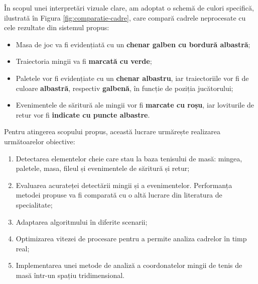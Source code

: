 În scopul unei interpretări vizuale clare, am adoptat o schemă de culori specifică, ilustrată în Figura \ref{fig:comparatie-cadre}, care compară cadrele neprocesate cu cele rezultate din sistemul propus:
\begin{itemize}
    \item Masa de joc va fi evidențiată cu un \textbf{chenar galben cu bordură albastră};
    \item Traiectoria mingii va fi \textbf{marcată cu verde};
    \item Paletele vor fi evidențiate cu un \textbf{chenar albastru}, iar traiectoriile vor fi de culoare \textbf{albastră}, respectiv \textbf{galbenă}, în funcție de poziția jucătorului;
    \item Evenimentele de săritură ale mingii vor fi \textbf{marcate cu roșu}, iar loviturile de retur vor fi \textbf{indicate cu puncte albastre}.
\end{itemize}


Pentru atingerea scopului propus, această lucrare urmărește realizarea următoarelor obiective:
\begin{enumerate}
    \item Detectarea elementelor cheie care stau la baza tenisului de masă: mingea, paletele, masa, fileul și evenimentele de săritură și retur;
    \item Evaluarea acurateței detectării mingii și a evenimentelor. Performanța metodei propuse va fi comparată cu o altă lucrare din literatura de specialitate;
    \item Adaptarea algoritmului în diferite scenarii;
    \item Optimizarea vitezei de procesare pentru a permite analiza cadrelor în timp real;
    \item Implementarea unei metode de analiză a coordonatelor mingii de tenis de masă într-un spațiu tridimensional.
\end{enumerate}




